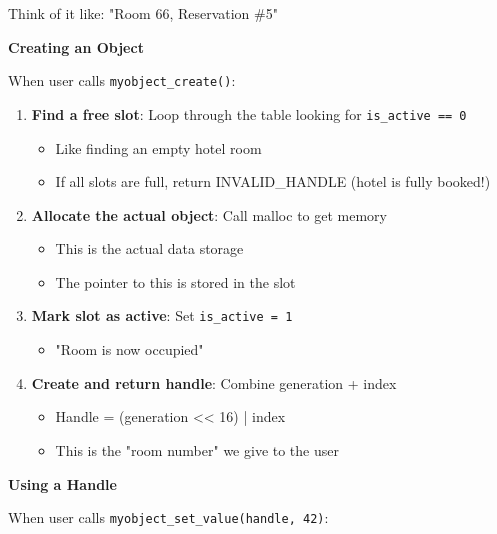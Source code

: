 Think of it like: "Room 66, Reservation \#5"

\textbf{Creating an Object}

When user calls \texttt{myobject\_create()}:

\begin{enumerate}
    \item \textbf{Find a free slot}: Loop through the table looking for \texttt{is\_active == 0}
    \begin{itemize}
        \item Like finding an empty hotel room
        \item If all slots are full, return INVALID\_HANDLE (hotel is fully booked!)
    \end{itemize}

    \item \textbf{Allocate the actual object}: Call malloc to get memory
    \begin{itemize}
        \item This is the actual data storage
        \item The pointer to this is stored in the slot
    \end{itemize}

    \item \textbf{Mark slot as active}: Set \texttt{is\_active = 1}
    \begin{itemize}
        \item "Room is now occupied"
    \end{itemize}

    \item \textbf{Create and return handle}: Combine generation + index
    \begin{itemize}
        \item Handle = (generation << 16) | index
        \item This is the "room number" we give to the user
    \end{itemize}
\end{enumerate}

\textbf{Using a Handle}

When user calls \texttt{myobject\_set\_value(handle, 42)}:

